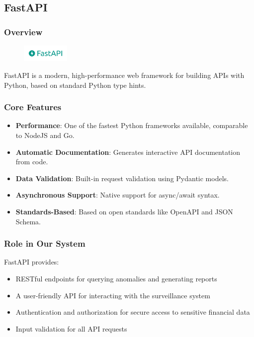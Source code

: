 \subsection{FastAPI}

\subsubsection{Overview}

\begin{figure}  %
    \vspace{-10pt} %
    \includegraphics[width=2.3cm]{figures/FastAPI_logo.png}
    \vspace{-10pt}
\end{figure}


FastAPI is a modern, high-performance web framework for building APIs with Python, based on standard Python type hints.

\subsubsection{Core Features}
\begin{itemize}
    \item \textbf{Performance}: One of the fastest Python frameworks available, comparable to NodeJS and Go.
    \item \textbf{Automatic Documentation}: Generates interactive API documentation from code.
    \item \textbf{Data Validation}: Built-in request validation using Pydantic models.
    \item \textbf{Asynchronous Support}: Native support for async/await syntax.
    \item \textbf{Standards-Based}: Based on open standards like OpenAPI and JSON Schema.
\end{itemize}

\subsubsection{Role in Our System}
FastAPI provides:
\begin{itemize}
    \item RESTful endpoints for querying anomalies and generating reports
    \item A user-friendly API for interacting with the surveillance system
    \item Authentication and authorization for secure access to sensitive financial data
    \item Input validation for all API requests
\end{itemize}

